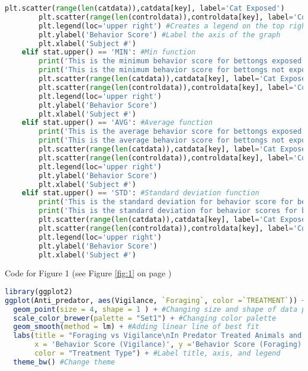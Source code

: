 \documentclass[letterpaper]{article}
\begin{document}
\begin{lstlisting}[language = Python]
        plt.scatter(range(len(catdata)),catdata[key], label='Cat Exposed')
        plt.scatter(range(len(controldata)),controldata[key], label='Control')
        plt.legend(loc='upper right') #Creates a legend on the top right with two labels, 'Cat Exposed' and 'Control'
        plt.ylabel('Behavior Score') #Label the axis of the graph 
        plt.xlabel('Subject #')
    elif stat.upper() == 'MIN': #Min function
        print('This is the minimum behavior score for bettongs exposed to cats:',round(catdata[key].min(), 3))
        print('This is the minimum behavior score for bettongs not exposed to cats:',round(controldata[key].min(), 3))
        plt.scatter(range(len(catdata)),catdata[key], label='Cat Exposed')
        plt.scatter(range(len(controldata)),controldata[key], label='Control')
        plt.legend(loc='upper right')
        plt.ylabel('Behavior Score')
        plt.xlabel('Subject #')
    elif stat.upper() == 'AVG': #Average function
        print('This is the average behavior score for bettongs exposed to cats:',round(catdata[key].mean(), 3))
        print('This is the average behavior score for bettongs not exposed to cats:',round(controldata[key].mean(), 3))
        plt.scatter(range(len(catdata)),catdata[key], label='Cat Exposed')
        plt.scatter(range(len(controldata)),controldata[key], label='Control')
        plt.legend(loc='upper right')
        plt.ylabel('Behavior Score')
        plt.xlabel('Subject #')
    elif stat.upper() == 'STD': #Standard deviation function
        print('This is the standard deviation for behavior score for bettongs exposed to cats:', round(catdata[key].std(), 3))
        print('This is the standard deviation for behavior scores for bettongs not exposed to cats:',round(controldata[key].std(), 3))
        plt.scatter(range(len(catdata)),catdata[key], label='Cat Exposed')
        plt.scatter(range(len(controldata)),controldata[key], label='Control')
        plt.legend(loc='upper right')
        plt.ylabel('Behavior Score')
        plt.xlabel('Subject #')
\end{lstlisting}

Code for Figure 1 (see Figure \ref{fig:1} on page \pageref{fig:1})
\begin{lstlisting}[language = R]
library(ggplot2)
ggplot(Anti_predator, aes(Vigilance, `Foraging`, color =`TREATMENT`)) + #Using Anti_predator dataset, call for Vigilance as my x-values and Foraging for my y-values, also colors the points based on treatment type
  geom_point(size = 4, shape = 1 ) + #Changing size and shape of data point
  scale_color_brewer(palette = "Set1") + #Changing color palette
  geom_smooth(method = lm) + #Adding linear line of best fit
  labs(title = "Foraging vs Vigilance\nIn Predator Treated Animals and Non-predator Treated Animals",
       x = 'Behavior Score (Vigilance)', y ='Behavior Score (Foraging)',
       color = "Treatment Type") + #Label title, axis, and legend
  theme_bw() #Change theme
\end{lstlisting}
\end{document}

